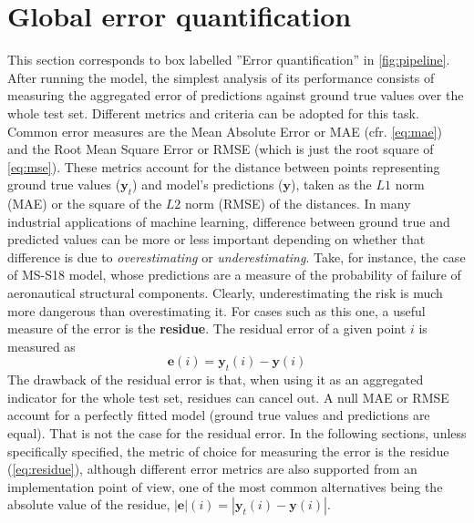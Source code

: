 \section{Global error quantification}\label{sec:globalerr}
\noindent This section corresponds to box labelled ''Error quantification'' in \autoref{fig:pipeline}.\\
%
\indent After running the model, the simplest analysis of its performance consists of measuring the aggregated error of predictions against ground true values over the whole test set. Different metrics and criteria can be adopted for this task. Common error measures are the Mean Absolute Error or MAE (cfr. \cref{eq:mae}) and the Root Mean Square Error or RMSE (which is just the root square of \cref{eq:mse}). These metrics account for the distance between points representing ground true values ($\mathbf{y}_t$) and model's predictions ($\mathbf{y}$), taken as the $L1$ norm (MAE) or the square of the $L2$ norm (RMSE) of the distances. In many industrial applications of machine learning, difference between ground true and predicted values can be more or less important depending on whether that difference is due to \textit{overestimating} or \textit{underestimating}. Take, for instance, the case of MS-S18 model, whose predictions are a measure of the probability of failure of aeronautical structural components. Clearly, underestimating the risk is much more dangerous than overestimating it. For cases such as this one, a useful measure of the error is the \textbf{residue}. The residual error of a given point $i$ is measured as
\begin{equation}\label{eq:residue}
	\mathbf{e}(i)=\mathbf{y}_t(i)-\mathbf{{y}}(i)
\end{equation}
The drawback of the residual error is that, when using it as an aggregated indicator for the whole test set, residues can cancel out. A null MAE or RMSE account for a perfectly fitted model (ground true values and predictions are equal). That is not the case for the residual error. In the following sections, unless specifically specified, the metric of choice for measuring the error is the residue (\autoref{eq:residue}), although different error metrics are also supported from an implementation point of view, one of the most common alternatives being the absolute value of the residue, $|\mathbf{e}|(i)=|\mathbf{y}_t(i)-\mathbf{{y}}(i)|$.\\
%
